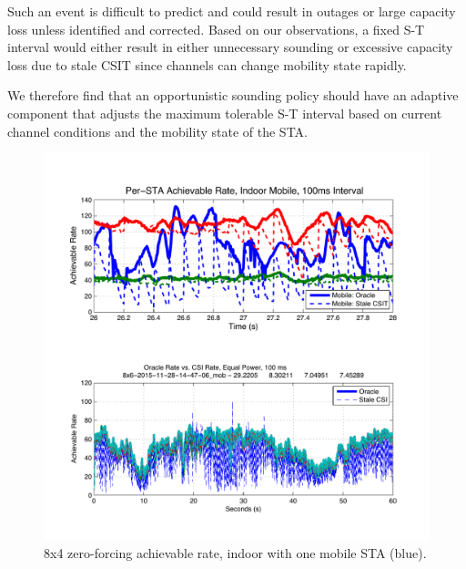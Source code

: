 	Such an event is difficult to predict and could result in outages or large capacity loss unless identified and corrected.
	Based on our observations, a fixed S-T interval would either result in either unnecessary sounding or excessive capacity loss due to stale \ac{CSIT} since channels can change mobility state rapidly.

 We therefore find that an opportunistic sounding policy should have an adaptive component that adjusts the maximum tolerable S-T interval based on current channel conditions and the mobility state of the \ac{STA}.

\begin{figure}[th] %
\centering
\includegraphics[width=1\linewidth]{./figs/protocol/indoor_clientmobility_100ms_in}
\caption{8x4 zero-forcing achievable rate, indoor with one mobile \ac{STA} (blue).}
\label{fig:capacity_100ms}
\vspace{-3mm}
\end{figure}

